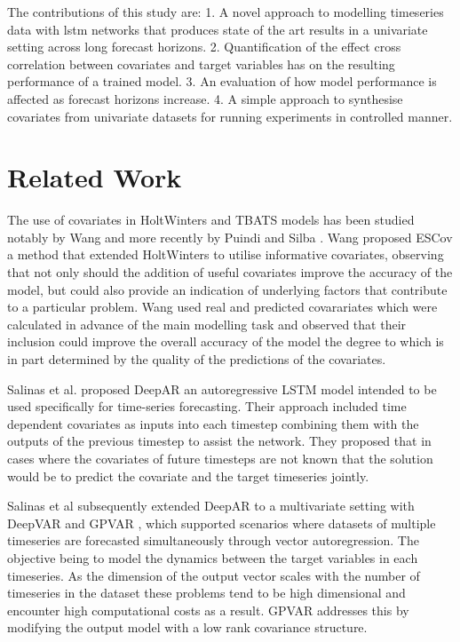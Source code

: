\documentclass{article}
\begin{document}
The contributions of this study are:
1. A novel approach to modelling timeseries data with lstm networks that produces state of the art results in a univariate setting across 
long forecast horizons.
2. Quantification of the effect cross correlation between covariates and target variables has on the resulting performance of a trained model.
3. An evaluation of how model performance is affected as forecast horizons increase. 
4. A simple approach to synthesise covariates from univariate datasets for running experiments in controlled manner.


\section{Related Work}
The use of covariates in HoltWinters and TBATS models has been studied notably by Wang\cite{wang2006} and more recently by Puindi and Silba 
\cite{puindi2020dynamic}. Wang proposed ESCov a method that extended HoltWinters to utilise informative covariates, observing that not only 
should the addition of useful covariates improve the accuracy of the model, but could also provide an indication of underlying
factors that contribute to a particular problem. Wang \cite{wang2006} used real and predicted covarariates which were calculated in advance of the main modelling
task and observed that their inclusion could improve the overall accuracy of the model the degree to which is in part
determined by the quality of the predictions of the covariates. 

Salinas et al. \cite{salinas2019deepar} proposed DeepAR an autoregressive LSTM model intended to be used specifically 
for time-series forecasting. Their approach included time dependent covariates as inputs into each timestep combining them 
with the outputs of the previous timestep to assist the network. They proposed that in cases 
where the covariates of future timesteps are not known that the solution would be to predict the covariate and the target timeseries jointly.

Salinas et al subsequently extended DeepAR to a multivariate setting with DeepVAR and GPVAR \cite{salinas2019highdimensional}, which supported 
scenarios where datasets of multiple timeseries are forecasted simultaneously through vector autoregression. The objective being to model the 
dynamics between the target variables in each timeseries. As the dimension of the output vector scales with the number of timeseries in the dataset 
these problems tend to be high dimensional and encounter high computational costs as a result. GPVAR addresses this by modifying the output model 
with a low rank covariance structure. 
\end{document}
